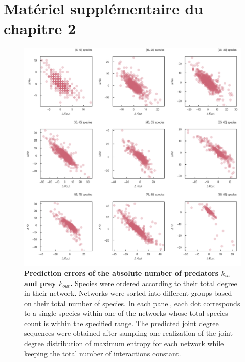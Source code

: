 
\francais   

\chapter*{Matériel supplémentaire du chapitre 2}

\begin{figure}[h]
    \centering
    \includegraphics[width=\textwidth]{figures/S_article2/kin_kout_difference_strata.png}
    \caption{\textbf{Prediction errors of the absolute number of predators $k_{in}$ and prey
    $k_{out}$.} Species were ordered according to their total degree in their
    network. Networks were sorted into different groups based on their total number
    of species. In each panel, each dot corresponds to a single species within one
    of the networks whose total species count is within the specified range. The
    predicted joint degree sequences were obtained after sampling one realization of
    the joint degree distribution of maximum entropy for each network while keeping
    the total number of interactions
    constant.}
    \label{fig:kin_kout_diff_strata}
\end{figure}

